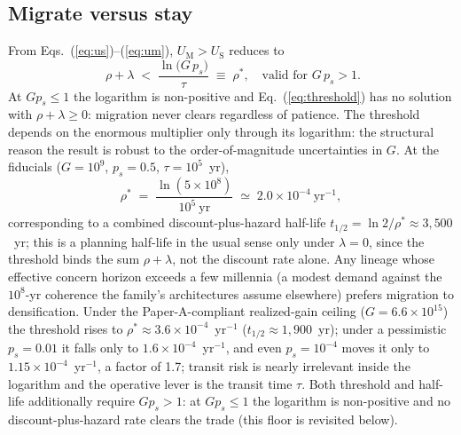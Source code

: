 \documentclass[11pt]{article}
\begin{document}
\subsection{Migrate versus stay}

From Eqs.~(\ref{eq:us})--(\ref{eq:um}), $U_{\mathrm M} > U_{\mathrm S}$ reduces to
\begin{equation}
\boxed{\;\rho + \lambda \;<\; \frac{\ln\!\big(G\,p_{s}\big)}{\tau}\;\equiv\;\rho^{*}, \quad \text{valid for } G\,p_{s} > 1.}
\label{eq:threshold}
\end{equation}
At $G p_s \leq 1$ the logarithm is non-positive and Eq.~(\ref{eq:threshold}) has no solution with $\rho+\lambda \geq 0$: migration never clears regardless of patience. The threshold depends on the enormous multiplier only through its logarithm: the structural reason the result is robust to the order-of-magnitude uncertainties in $G$. At the fiducials ($G = 10^{9}$, $p_{s} = 0.5$, $\tau = 10^{5}$~yr),
\begin{equation}
\rho^{*} \;=\; \frac{\ln(5\times10^{8})}{10^{5}\ \mathrm{yr}} \;\simeq\; 2.0\times10^{-4}\ \mathrm{yr^{-1}},
\end{equation}
corresponding to a combined discount-plus-hazard half-life $t_{1/2} = \ln 2/\rho^{*} \approx 3{,}500$~yr; this is a planning half-life in the usual sense only under $\lambda = 0$, since the threshold binds the sum $\rho + \lambda$, not the discount rate alone. Any lineage whose effective concern horizon exceeds a few millennia (a modest demand against the $10^{8}$-yr coherence the family's architectures assume elsewhere) prefers migration to densification. Under the Paper-A-compliant realized-gain ceiling ($G = 6.6\times10^{15}$) the threshold rises to $\rho^{*} \approx 3.6\times10^{-4}$~yr$^{-1}$ ($t_{1/2} \approx 1{,}900$~yr); under a pessimistic $p_{s} = 0.01$ it falls only to $1.6\times10^{-4}$~yr$^{-1}$, and even $p_{s} = 10^{-4}$ moves it only to $1.15\times10^{-4}$~yr$^{-1}$, a factor of 1.7; transit risk is nearly irrelevant inside the logarithm and the operative lever is the transit time $\tau$. Both threshold and half-life additionally require $G p_{s} > 1$: at $G p_s \leq 1$ the logarithm is non-positive and no discount-plus-hazard rate clears the trade (this floor is revisited below).
\end{document}
